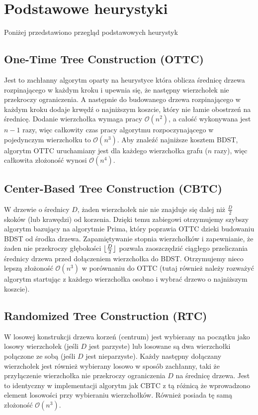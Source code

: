 \section{Podstawowe heurystyki}
Poniżej przedstawiono przegląd podstawowych heurystyk

\subsection{One-Time Tree Construction (OTTC)}

Jest to zachłanny algorytm oparty na heurystyce która oblicza średnicę drzewa rozpinającego w każdym kroku i upewnia się, że następny wierzchołek nie przekroczy ograniczenia. A następnie do budowanego drzewa rozpinającego w każdym kroku dodaje krwędź o najniższym koszcie, który nie łamie obostrzeń na średnicę. Dodanie wierzchołka wymaga pracy $\mathcal{O}(n^2)$, a całość wykonywana jest $n-1$ razy, więc całkowity czas pracy algorytmu rozpoczynającego w pojedynczym wierzchołku to $\mathcal{O}(n^3)$. Aby znaleźć najniższe kosztem BDST, algorytm OTTC uruchamiany jest dla każdego wierzchołka grafu ($n$ razy), więc całkowita złożoność wynosi $\mathcal{O}(n^4)$.

\subsection{Center-Based Tree Construction (CBTC)}
W drzewie o średnicy $D$, żaden wierzchołek nie nie znajduje się dalej niż $\frac{D}{2}$ skoków (lub krawędzi) od korzenia. Dzięki temu zabiegowi otrzymujemy szybszy algorytm bazujący na algorytmie Prima, który poprawia OTTC dzieki budowaniu BDST od środka drzewa. Zapamiętywanie stopnia wierzchołków i zapewnianie, że żaden nie przekroczy głębokości $\lfloor\frac{D}{2}\rfloor$ pozwala zaoszczędzić ciągłego przeliczania średnicy drzewa przed dołączeniem wierzchołka do BDST. Otrzymujemy nieco lepszą złożoność $\mathcal{O}(n^3)$ w porównaniu do OTTC (tutaj również należy rozważyć algorytm startując z każdego wierzchołka osobno i wybrać drzewo o najniższym koszcie).

\subsection{Randomized Tree Construction (RTC)}
W losowej konstrukcji drzewa korzeń (centrum) jest wybierany na początku jako losowy wierzchołek (jeśli $D$ jest parzyste) lub losowane są dwa wierzchołki połączone ze sobą (jeśli $D$ jest nieparzyste). Każdy następny dołączany wierzchołek jest również wybierany losowo w sposób zachłanny, taki że przyłączenie wierzchołka nie przekroczy ograniczenia $D$ na średnicę drzewa. Jest to identyczny w implementacji algorytm jak CBTC z tą różnicą że wprowadzono element losowości przy wybieraniu wierzchołków. Również posiada tę samą złożoność $\mathcal{O}(n^3)$.

